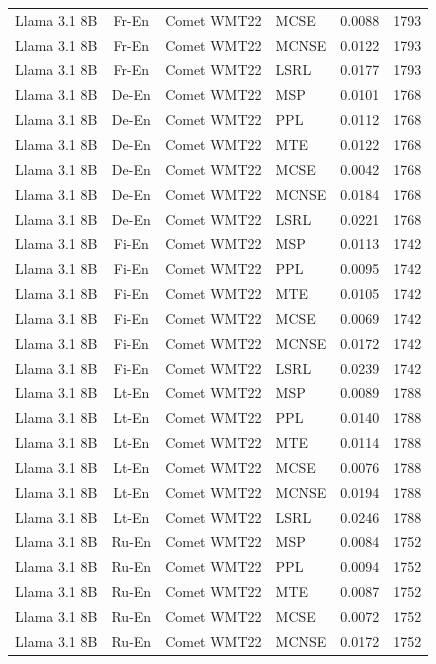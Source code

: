 \begin{table}
\begin{tabular}{lc}
Llama 3.1 8B & Fr-En & Comet WMT22 & MCSE & 0.0088 & 1793 \\
Llama 3.1 8B & Fr-En & Comet WMT22 & MCNSE & 0.0122 & 1793 \\
Llama 3.1 8B & Fr-En & Comet WMT22 & LSRL & 0.0177 & 1793 \\
Llama 3.1 8B & De-En & Comet WMT22 & MSP & 0.0101 & 1768 \\
Llama 3.1 8B & De-En & Comet WMT22 & PPL & 0.0112 & 1768 \\
Llama 3.1 8B & De-En & Comet WMT22 & MTE & 0.0122 & 1768 \\
Llama 3.1 8B & De-En & Comet WMT22 & MCSE & 0.0042 & 1768 \\
Llama 3.1 8B & De-En & Comet WMT22 & MCNSE & 0.0184 & 1768 \\
Llama 3.1 8B & De-En & Comet WMT22 & LSRL & 0.0221 & 1768 \\
Llama 3.1 8B & Fi-En & Comet WMT22 & MSP & 0.0113 & 1742 \\
Llama 3.1 8B & Fi-En & Comet WMT22 & PPL & 0.0095 & 1742 \\
Llama 3.1 8B & Fi-En & Comet WMT22 & MTE & 0.0105 & 1742 \\
Llama 3.1 8B & Fi-En & Comet WMT22 & MCSE & 0.0069 & 1742 \\
Llama 3.1 8B & Fi-En & Comet WMT22 & MCNSE & 0.0172 & 1742 \\
Llama 3.1 8B & Fi-En & Comet WMT22 & LSRL & 0.0239 & 1742 \\
Llama 3.1 8B & Lt-En & Comet WMT22 & MSP & 0.0089 & 1788 \\
Llama 3.1 8B & Lt-En & Comet WMT22 & PPL & 0.0140 & 1788 \\
Llama 3.1 8B & Lt-En & Comet WMT22 & MTE & 0.0114 & 1788 \\
Llama 3.1 8B & Lt-En & Comet WMT22 & MCSE & 0.0076 & 1788 \\
Llama 3.1 8B & Lt-En & Comet WMT22 & MCNSE & 0.0194 & 1788 \\
Llama 3.1 8B & Lt-En & Comet WMT22 & LSRL & 0.0246 & 1788 \\
Llama 3.1 8B & Ru-En & Comet WMT22 & MSP & 0.0084 & 1752 \\
Llama 3.1 8B & Ru-En & Comet WMT22 & PPL & 0.0094 & 1752 \\
Llama 3.1 8B & Ru-En & Comet WMT22 & MTE & 0.0087 & 1752 \\
Llama 3.1 8B & Ru-En & Comet WMT22 & MCSE & 0.0072 & 1752 \\
Llama 3.1 8B & Ru-En & Comet WMT22 & MCNSE & 0.0172 & 1752 \\

\end{tabular}
\end{table}
